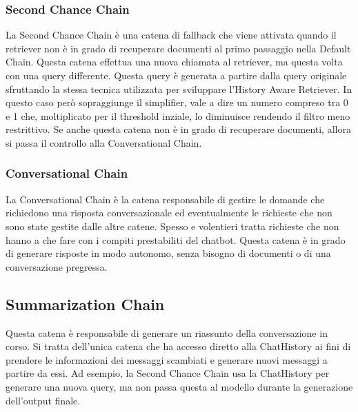 \subsubsection{Second Chance Chain}
La Second Chance Chain è una catena di fallback che viene attivata quando il retriever non è in grado di recuperare documenti al primo passaggio nella Default Chain. Questa catena effettua una nuova chiamata al retriever, ma questa volta con una query differente. Questa query è generata a partire dalla query originale sfruttando la stessa tecnica utilizzata per sviluppare l'History Aware Retriever. In questo caso però sopraggiunge il simplifier, vale a dire un numero compreso tra 0 e 1 che, moltiplicato per il threshold inziale, lo diminuisce rendendo il filtro meno restrittivo. Se anche questa catena non è in grado di recuperare documenti, allora si passa il controllo alla Conversational Chain.

\subsubsection{Conversational Chain}
La Conversational Chain è la catena responsabile di gestire le domande che richiedono una risposta conversazionale ed eventualmente le richieste che non sono state gestite dalle altre catene. Spesso e volentieri tratta richieste che non hanno a che fare con i compiti prestabiliti del chatbot. Questa catena è in grado di generare risposte in modo autonomo, senza bisogno di documenti o di una conversazione pregressa.

\subsection{Summarization Chain}
Questa catena è responsabile di generare un riassunto della conversazione in corso. Si tratta dell'unica catena che ha accesso diretto alla ChatHistory ai fini di prendere le informazioni dei messaggi scambiati e generare nuovi messaggi a partire da essi. Ad esempio, la Second Chance Chain usa la ChatHistory per generare una nuova query, ma non passa questa al modello durante la generazione dell'output finale.


